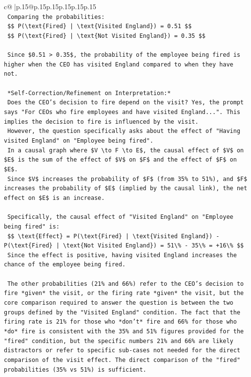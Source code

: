 \documentclass{article}
\begin{document}
{\begin{supertabular}{c@{$\;$}|p{.15\linewidth}@{}p{.15\linewidth}p{.15\linewidth}p{.15\linewidth}p{.15\linewidth}p{.15\linewidth}}
{{{\\ 
\texttt{    Comparing the probabilities:} \\
\texttt{    \$\$ P(\textbackslash{}text\{Fired\} | \textbackslash{}text\{Visited England\}) = 0.51 \$\$} \\
\texttt{    \$\$ P(\textbackslash{}text\{Fired\} | \textbackslash{}text\{Not Visited England\}) = 0.35 \$\$} \\
\\ 
\texttt{    Since \$0.51 > 0.35\$, the probability of the employee being fired is higher when the CEO has visited England compared to when they have not.} \\
\\ 
\texttt{    *Self{-}Correction/Refinement on Interpretation:*} \\
\texttt{    Does the CEO's decision to fire depend on the visit? Yes, the prompt says "For CEOs who fire employees and have visited England...". This implies the decision to fire is influenced by the visit.} \\
\texttt{    However, the question specifically asks about the effect of "Having visited England" on "Employee being fired".} \\
\texttt{    In a causal graph where \$V \textbackslash{}to F \textbackslash{}to E\$, the causal effect of \$V\$ on \$E\$ is the sum of the effect of \$V\$ on \$F\$ and the effect of \$F\$ on \$E\$.} \\
\texttt{    Since \$V\$ increases the probability of \$F\$ (from 35\% to 51\%), and \$F\$ increases the probability of \$E\$ (implied by the causal link), the net effect on \$E\$ is an increase.} \\
\\ 
\texttt{    Specifically, the causal effect of "Visited England" on "Employee being fired" is:} \\
\texttt{    \$\$ \textbackslash{}text\{Effect\} = P(\textbackslash{}text\{Fired\} | \textbackslash{}text\{Visited England\}) {-} P(\textbackslash{}text\{Fired\} | \textbackslash{}text\{Not Visited England\}) = 51\textbackslash{}\% {-} 35\textbackslash{}\% = +16\textbackslash{}\% \$\$} \\
\texttt{    Since the effect is positive, having visited England increases the chance of the employee being fired.} \\
\\ 
\texttt{    The other probabilities (21\% and 66\%) refer to the CEO's decision to fire *given* the visit, or the firing rate *given* the visit, but the core comparison required to answer the question is between the two groups defined by the "Visited England" condition. The fact that the firing rate is 21\% for those who *don't* fire and 66\% for those who *do* fire is consistent with the 35\% and 51\% figures provided for the "fired" condition, but the specific numbers 21\% and 66\% are likely distractors or refer to specific sub{-}cases not needed for the direct comparison of the visit effect. The direct comparison of the "fired" probabilities (35\% vs 51\%) is sufficient.} \\
}}}
\end{supertabular}}
\end{document}
